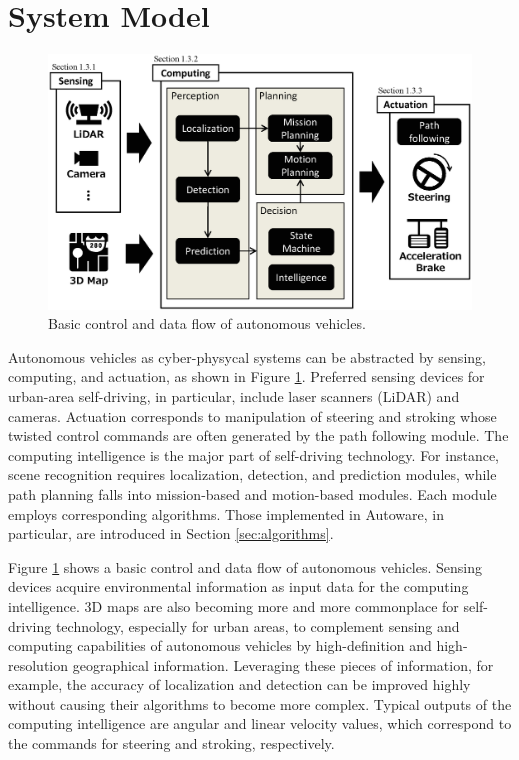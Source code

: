 \section{System Model}
\label{sec:system_model}

\begin{figure}[!htbp]
  \centering
  \includegraphics[width=0.6\linewidth]{../figure/Autoware/system_model.eps}
  \caption{\label{fig:system_model}
    Basic control and data flow of autonomous vehicles.}
\end{figure}

Autonomous vehicles as cyber-physycal systems can be abstracted by
sensing, computing, and actuation, as shown in Figure
\ref{fig:system_model}.
Preferred sensing devices for urban-area self-driving, in particular,
include laser scanners (LiDAR) and cameras.
Actuation corresponds to manipulation of steering and stroking whose
twisted control commands are often generated by the path following module.
The computing intelligence is the major part of self-driving technology.
For instance, scene recognition requires localization, detection, and
prediction modules, while path planning falls into mission-based and
motion-based modules.
Each module employs corresponding algorithms.
Those implemented in Autoware, in particular, are introduced in Section
\ref{sec:algorithms}.

Figure \ref{fig:system_model} shows a basic control and data flow of
autonomous vehicles.
Sensing devices acquire environmental information as input data for the
computing intelligence.
3D maps are also becoming more and more commonplace for self-driving
technology, especially for urban areas, to complement sensing and
computing capabilities of autonomous vehicles by high-definition and
high-resolution geographical information.
Leveraging these pieces of information, for example, the accuracy of
localization and detection can be improved highly without causing their
algorithms to become more complex.
Typical outputs of the computing intelligence are angular and linear
velocity values, which correspond to the commands for steering and
stroking, respectively.


